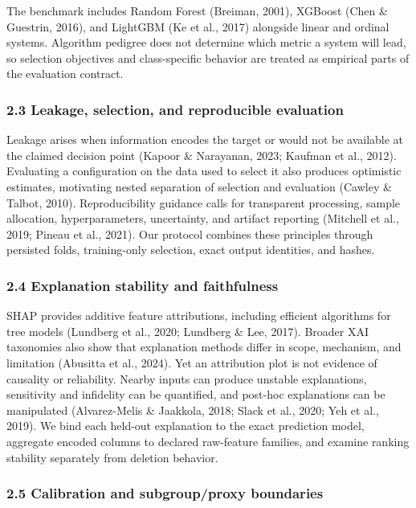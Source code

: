 \documentclass[
  a4paper,
  review]{elsarticle}
\begin{document}
The benchmark includes Random Forest (Breiman, 2001), XGBoost (Chen \&
Guestrin, 2016), and LightGBM (Ke et al., 2017) alongside linear and
ordinal systems. Algorithm pedigree does not determine which metric a
system will lead, so selection objectives and class-specific behavior
are treated as empirical parts of the evaluation contract.

\subsubsection{2.3 Leakage, selection, and reproducible
evaluation}\label{leakage-selection-and-reproducible-evaluation}

Leakage arises when information encodes the target or would not be
available at the claimed decision point (Kapoor \& Narayanan, 2023;
Kaufman et al., 2012). Evaluating a configuration on the data used to
select it also produces optimistic estimates, motivating nested
separation of selection and evaluation (Cawley \& Talbot, 2010).
Reproducibility guidance calls for transparent processing, sample
allocation, hyperparameters, uncertainty, and artifact reporting
(Mitchell et al., 2019; {Pineau et al.}, 2021). Our protocol combines
these principles through persisted folds, training-only selection, exact
output identities, and hashes.

\subsubsection{2.4 Explanation stability and
faithfulness}\label{explanation-stability-and-faithfulness}

SHAP provides additive feature attributions, including efficient
algorithms for tree models (Lundberg et al., 2020; Lundberg \& Lee,
2017). Broader XAI taxonomies also show that explanation methods differ
in scope, mechanism, and limitation (Abusitta et al., 2024). Yet an
attribution plot is not evidence of causality or reliability. Nearby
inputs can produce unstable explanations, sensitivity and infidelity can
be quantified, and post-hoc explanations can be manipulated
(Alvarez-Melis \& Jaakkola, 2018; Slack et al., 2020; Yeh et al., 2019).
We bind each held-out explanation to the exact prediction model,
aggregate encoded columns to declared raw-feature families, and examine
ranking stability separately from deletion behavior.

\subsubsection{2.5 Calibration and subgroup/proxy
boundaries}\label{calibration-and-subgroupproxy-boundaries}
\end{document}
